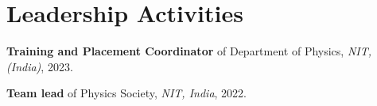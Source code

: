 \section{Leadership Activities}
    \begin{highlights}
        \item \textbf{Training and Placement Coordinator} of Department of Physics, \textit{NIT, (India)}, 2023. \href{https://drive.google.com/file/d/1HqrjTPm8iYTATSWPX4xKo5fCLTT3ztci/view?usp=sharing}{\faExternalLink} 
        
        \item \textbf{Team lead} of Physics Society, \textit{NIT, India}, 2022.

    \end{highlights}
    
    
    
        



    